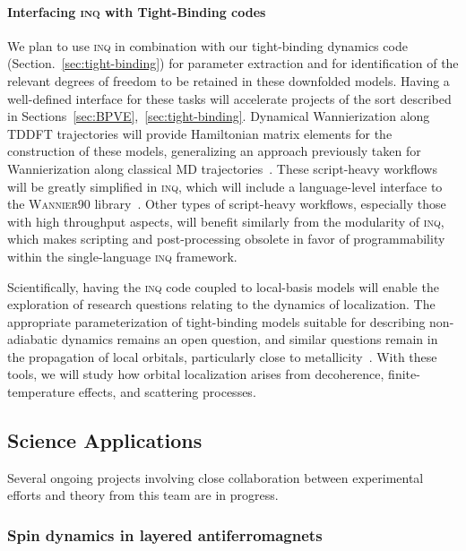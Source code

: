 
\paragraph{Interfacing \textsc{inq} with Tight-Binding codes}\label{sec:future-tb}

We plan to use \textsc{inq} in combination with our tight-binding dynamics code (Section.~\ref{sec:tight-binding}) for parameter extraction and for identification of the relevant degrees of freedom to be retained in these downfolded models. 
Having a well-defined interface for these tasks will accelerate projects of the sort described in Sections~\ref{sec:BPVE},~\ref{sec:tight-binding}. Dynamical Wannierization along TDDFT trajectories will provide Hamiltonian matrix elements for the construction of these models, generalizing an approach previously taken for Wannierization along classical MD trajectories~\cite{Abramovitch2021}. 
These script-heavy workflows will be greatly simplified in \textsc{inq}, which will include a language-level interface to the \textsc{Wannier90} library~\cite{Mostofi2008}. 
Other types of script-heavy workflows, especially those with high throughput aspects, will benefit similarly from the modularity of \textsc{inq}, which makes scripting and post-processing obsolete in favor of programmability within the single-language \textsc{inq} framework.

Scientifically, having the \textsc{inq} code coupled to local-basis models will enable the exploration of research questions relating to the dynamics of localization. 
The appropriate parameterization of tight-binding models suitable for describing non-adiabatic dynamics remains an open question, and similar questions remain in the propagation of local orbitals, particularly close to metallicity~\cite{Yost2019}. 
With these tools, we will study how orbital localization arises from decoherence, finite-temperature effects, and scattering processes.  

\subsection{Science Applications}

Several ongoing projects involving close collaboration between experimental efforts and theory from this team are in progress.

\subsubsection{Spin dynamics in layered antiferromagnets}\label{sec:2dafm}

